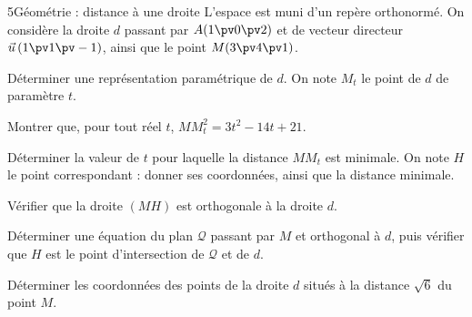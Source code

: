 \begin{exoBac}{5}{Géométrie : distance à une droite}
L'espace est muni d'un repère orthonormé. On considère la droite $d$ passant par $A(1\pv0\pv2)$ et de vecteur directeur
$\vec u\,(1\pv1\pv-1)$, ainsi que le point $M(3\pv4\pv1)$.
\begin{questions}
  \item Déterminer une représentation paramétrique de $d$. On note $M_t$ le point de $d$ de paramètre $t$.
  \item Montrer que, pour tout réel $t$, $MM_t^{2}=3t^{2}-14t+21$.
  \item Déterminer la valeur de $t$ pour laquelle la distance $MM_t$ est minimale. On note $H$ le point correspondant : donner ses
    coordonnées, ainsi que la distance minimale.
  \item Vérifier que la droite $(MH)$ est orthogonale à la droite $d$.
  \item Déterminer une équation du plan $\mathcal{Q}$ passant par $M$ et orthogonal à $d$, puis vérifier que $H$ est le point d'intersection
    de $\mathcal{Q}$ et de $d$.
  \item Déterminer les coordonnées des points de la droite $d$ situés à la distance $\sqrt6$ du point $M$.
\end{questions}
\end{exoBac}
